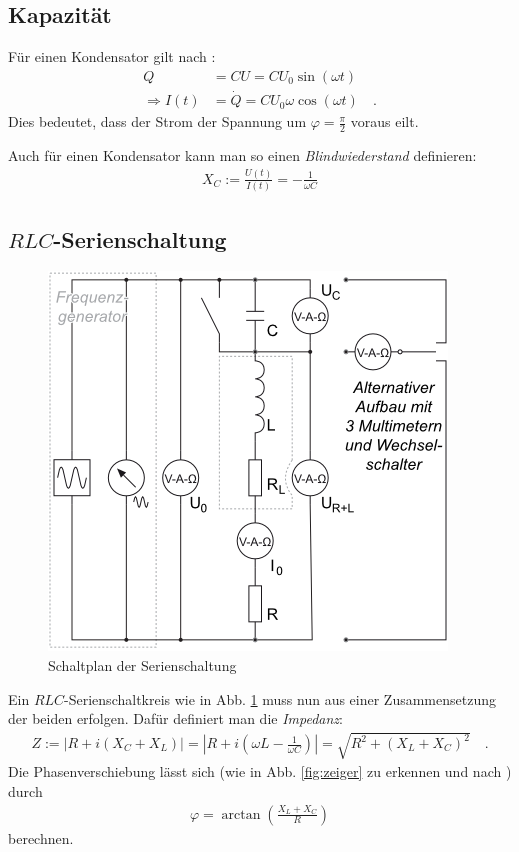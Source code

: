 \documentclass[12pt,a4paper,titlepage,headinclude,bibtotoc]{scrartcl}
\begin{document}
\subsection{Kapazität}
Für einen Kondensator gilt nach \cite[S. 822]{giancoli}:
\begin{align*}
Q&=CU=CU_0\sin(\omega t)\\
\Rightarrow I(t)&=\dot Q=CU_0\omega\cos(\omega t)\quad .
\end{align*}
Dies bedeutet, dass der Strom der Spannung um $\varphi=\frac{\pi}{2}$ voraus eilt.

Auch für einen Kondensator kann man so einen \emph{Blindwiederstand} definieren:
\begin{align}
X_C:=\frac{U(t)}{I(t)}=-\frac{1}{\omega C}
\end{align}

\subsection{$RLC$-Serienschaltung}
\label{sec:RLC}
\begin{figure}[!h]
\centering
\includegraphics[width=0.7\linewidth]{serie}
\caption{Schaltplan der Serienschaltung}
\label{fig:serienschaltung}
\end{figure}
Ein $RLC$-Serienschaltkreis wie in Abb. \ref{fig:serienschaltung} muss nun aus einer Zusammensetzung der beiden erfolgen.
Dafür definiert man die \emph{Impedanz}:
\begin{align}
Z:=\left|R+i(X_C+X_L)\right|=\left|R+i\left( \omega L-\frac{1}{\omega C} \right)\right|=\sqrt{R^2+(X_L+X_C)^2}\quad .
\end{align}
Die Phasenverschiebung lässt sich (wie in Abb. \ref{fig:zeiger} zu erkennen und nach \cite[S. 1042]{giancoli}) durch
\begin{align}
\varphi=\arctan\left( \frac{X_L+X_C}{R} \right)
\end{align}
berechnen.
\end{document}
